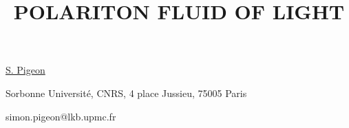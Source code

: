 \title{POLARITON FLUID OF LIGHT}

\underline{S. Pigeon}  

{\normalsize{\vspace{-4mm}
Sorbonne Université, CNRS,
4 place Jussieu,
75005 Paris



\email simon.pigeon@lkb.upmc.fr}}


\vspace{\baselineskip}
